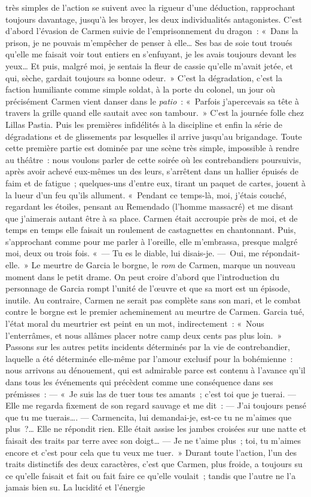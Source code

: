 \documentclass[french,twoside]{book} %
\begin{document}
très simples de l’action se suivent avec la rigueur d’une déduction, rapprochant toujours davantage, jusqu’à les broyer, les deux individualités antagonistes. C’est d’abord l’évasion de Carmen suivie de l’emprisonnement du dragon : « Dans la prison, je ne pouvais m’empêcher de penser à elle… Ses bas de soie tout troués qu’elle me faisait voir tout entiers en s’enfuyant, je les avais toujours devant les yeux… Et puis, malgré moi, je sentais la fleur de cassie qu’elle m’avait jetée, et qui, sèche, gardait toujours sa bonne odeur. » C’est la dégradation, c’est la faction humiliante comme simple soldat, à la porte du colonel, un jour où précisément Carmen vient danser dans le \emph{patio} : « Parfois j’apercevais sa tête à travers la grille quand elle sautait avec son tambour. » C’est la journée folle chez Lillas Pastia. Puis les premières infidélités à la discipline et enfin la série de dégradations et de glissements par lesquelles il arrive jusqu’au brigandage. Toute cette première partie est dominée par une scène très simple, impossible à rendre au théâtre : nous voulons parler de cette soirée où les contrebandiers poursuivis, après avoir achevé eux-mêmes un des leurs, s’arrêtent dans un hallier épuisés de faim et de fatigue ; quelques-uns d’entre eux, tirant un paquet de cartes, jouent à la lueur d’un feu qu’ils allument. « Pendant ce temps-là, moi, j’étais couché, regardant les étoiles, pensant au Remendado (l’homme massacré) et me disant que j’aimerais autant être à sa place. Carmen était accroupie près de moi, et de temps en temps elle faisait un roulement de castagnettes en chantonnant. Puis, s’approchant comme pour me parler à l’oreille, elle m’embrassa, presque malgré moi, deux ou trois fois. « — Tu es le diable, lui disais-je. — Oui, me répondait-elle. » Le meurtre de Garcia le borgne, le \emph{rom} de Carmen, marque un nouveau moment dans le petit drame. On peut croire d’abord que l’introduction du personnage de Garcia rompt l’unité de l’œuvre et que sa mort est un épisode, inutile. Au contraire, Carmen ne serait pas complète sans son mari, et le combat contre le borgne est le premier acheminement au meurtre de Carmen. Garcia tué, l’état moral du meurtrier est peint en un mot, indirectement : « Nous l’enterrâmes, et nous allâmes placer notre camp deux cents pas plus loin. » Passons sur les autres petits incidents déterminés par la vie de contrebandier, laquelle a été déterminée elle-même par l’amour exclusif pour la bohémienne : nous arrivons au dénouement, qui est admirable parce est contenu à l’avance qu’il dans tous les événements qui précèdent comme une conséquence dans ses prémisses : — « Je suis las de tuer tous tes amants ; c’est toi que je tuerai. — Elle me regarda fixement de son regard sauvage et me dit : — J’ai toujours pensé que tu me tuerais…. — Carmencita, lui demandai-je, est-ce tu ne m’aimes que plus ?… Elle ne répondit rien. Elle était assise les jambes croisées sur une natte et faisait des traits par terre avec son doigt… — Je ne t’aime plus ; toi, tu m’aimes encore et c’est pour cela que tu veux me tuer. » Durant toute l’action, l’un des traits distinctifs des deux caractères, c’est que Carmen, plus froide, a toujours su ce qu’elle faisait et fait ou fait faire ce qu’elle voulait ; tandis que l’autre ne l’a jamais bien su. La lucidité et l’énergie 
\end{document}
